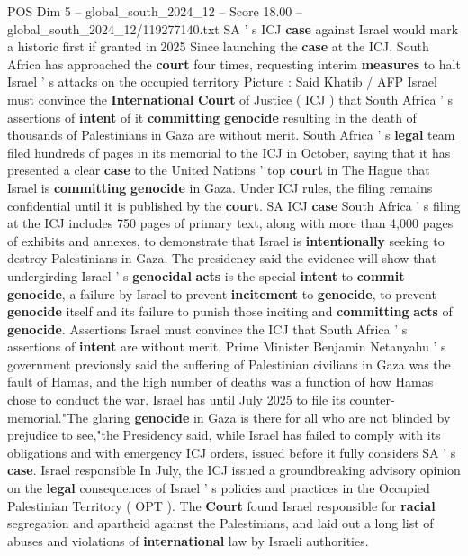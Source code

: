 \begin{textsample}{POS Dim 5 – global\_south\_2024\_12 – Score 18.00 – global\_south\_2024\_12/119277140.txt}  \label{ex:f5_pos_044}
SA ' s ICJ \textbf{case} against Israel would mark a historic first if granted in 2025 Since launching the \textbf{case} at the ICJ, South Africa has approached the \textbf{court} four times, requesting interim \textbf{measures} to halt Israel ' s attacks on the occupied territory Picture : Said Khatib / AFP Israel must convince the \textbf{International} \textbf{Court} of Justice ( ICJ ) that South Africa ' s assertions of \textbf{intent} of it \textbf{committing} \textbf{genocide} resulting in the death of thousands of Palestinians in Gaza are without merit.
South Africa ' s \textbf{legal} team filed hundreds of pages in its memorial to the ICJ in October, saying that it has presented a clear \textbf{case} to the United Nations ' top \textbf{court} in The Hague that Israel is \textbf{committing} \textbf{genocide} in Gaza.
Under ICJ rules, the filing remains confidential until it is published by the \textbf{court}.
SA ICJ \textbf{case} South Africa ' s filing at the ICJ includes 750 pages of primary text, along with more than 4,000 pages of exhibits and annexes, to demonstrate that Israel is \textbf{intentionally} seeking to destroy Palestinians in Gaza.
The presidency said the evidence will show that undergirding Israel ' s \textbf{genocidal} \textbf{acts} is the special \textbf{intent} to \textbf{commit} \textbf{genocide}, a failure by Israel to prevent \textbf{incitement} to \textbf{genocide}, to prevent \textbf{genocide} itself and its failure to punish those inciting and \textbf{committing} \textbf{acts} of \textbf{genocide}.
Assertions Israel must convince the ICJ that South Africa ' s assertions of \textbf{intent} are without merit.
Prime Minister Benjamin Netanyahu ' s government previously said the suffering of Palestinian civilians in Gaza was the fault of Hamas, and the high number of deaths was a function of how Hamas chose to conduct the war.
Israel has until July 2025 to file its counter-memorial."The glaring \textbf{genocide} in Gaza is there for all who are not blinded by prejudice to see,"the Presidency said, while Israel has failed to comply with its obligations and with emergency ICJ orders, issued before it fully considers SA ' s \textbf{case}.
Israel responsible In July, the ICJ issued a groundbreaking advisory opinion on the \textbf{legal} consequences of Israel ' s policies and practices in the Occupied Palestinian Territory ( OPT ).
The \textbf{Court} found Israel responsible for \textbf{racial} segregation and apartheid against the Palestinians, and laid out a long list of abuses and violations of \textbf{international} law by Israeli authorities.

\end{textsample}
